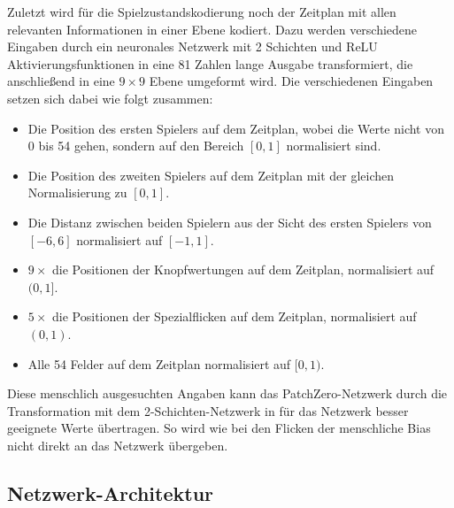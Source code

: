 \vspace*{-5cm}
\pagebreak

Zuletzt wird für die Spielzustandskodierung noch der Zeitplan mit allen relevanten Informationen in einer Ebene kodiert. Dazu werden verschiedene Eingaben durch ein neuronales Netzwerk mit 2 Schichten und \ac{ReLU} Aktivierungsfunktionen in eine 81 Zahlen lange Ausgabe transformiert, die anschließend in eine $9\times 9$ Ebene umgeformt wird. Die verschiedenen Eingaben setzen sich dabei wie folgt zusammen:

\begin{itemize}
    \item \vspace*{-0.1cm} Die Position des ersten Spielers auf dem Zeitplan, wobei die Werte nicht von 0 bis 54 gehen, sondern auf den Bereich $\left[0,1\right]$ normalisiert sind.
    \item \vspace*{-0.2cm} Die Position des zweiten Spielers auf dem Zeitplan mit der gleichen Normalisierung zu $\left[0,1\right]$.
    \item \vspace*{-0.2cm} Die Distanz zwischen beiden Spielern aus der Sicht des ersten Spielers von $\left[-6,6\right]$ normalisiert auf $\left[-1,1\right]$.
    \item \vspace*{-0.2cm} $9\times$ die Positionen der Knopfwertungen auf dem Zeitplan, normalisiert auf $(0,1]$.
    \item \vspace*{-0.2cm} $5\times$ die Positionen der Spezialflicken auf dem Zeitplan, normalisiert auf $(0,1)$.
    \item \vspace*{-0.2cm} Alle 54 Felder auf dem Zeitplan normalisiert auf $[0,1)$.
\end{itemize}
\vspace*{-0.1cm}

Diese menschlich ausgesuchten Angaben kann das PatchZero-Netzwerk durch die Transformation mit dem 2-Schichten-Netzwerk in für das Netzwerk besser geeignete Werte übertragen. So wird wie bei den Flicken der menschliche Bias nicht direkt an das Netzwerk übergeben.

\subsection{Netzwerk-Architektur}

